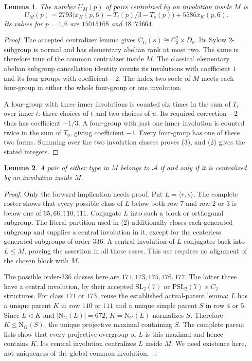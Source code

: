\documentclass[11pt,a4paper]{article}
\newtheorem{lemma}{Lemma}
\newcommand{\C}{\mathrm C}\newcommand{\N}{\mathrm N}\newcommand{\Z}{\mathrm Z}
\begin{document}
\begin{lemma}\label{internal}
The number $U_M(p)$ of pairs centralized by an involution inside $M$ is
\[
 U_M(p)=2793\bigl(x_H(p,6)-T_i(p)/3-T_o(p)\bigr)
                      +5586x_K(p,6).                       \tag{3}
\]
Its values for $p=4,6$ are $15015168$ and $48173664$.
\end{lemma}
\begin{proof}
The accepted centralizer lemma gives
$\C_G(s)\cong C_3^2\times D_8$. Its Sylow 2-subgroup is normal
and has elementary abelian rank at most two. The same is therefore true
of the common centralizer inside $M$. The classical elementary
abelian subgroup cancellation identity counts its involutions
with coefficient $1$ and its four-groups with coefficient $-2$.
The index-two socle of $M$ meets each four-group in either the whole
four-group or one involution.

A four-group with three inner involutions is counted six times
in the sum of $T_i$ over inner $t$: three choices of $t$ and two
choices of $u$. Its required correction $-2$ thus has coefficient
$-1/3$. A four-group with just one inner involution is counted twice
in the sum of $T_o$, giving coefficient $-1$. Every four-group has
one of these two forms. Summing over the two involution classes
proves (3), and (2) gives the stated integers.
\end{proof}

\begin{lemma}\label{external}
A pair of either type in $M$ belongs to $\mathcal A$ if and only
if it is centralized by an involution inside $M$.
\end{lemma}
\begin{proof}
Only the forward implication needs proof. Put $L=\langle r,s\rangle$.
The complete roster shows that every possible class of $L$ below
both row $7$ and row $2$ or $3$ is below one of $65,66,110,111$.
Conjugate $L$ into such a block or orthogonal subgroup. The literal
partition used in (2) additionally closes each generated subgroup
and supplies a central involution in it, except for the centerless
generated subgroups of order $336$. A central involution of $L$
conjugates back into $L\le M$, proving the assertion in all those
cases. This use requires no alignment of the chosen block with $M$.

The possible order-$336$ classes here are $171,173,175,176,177$.
The latter three have a central involution, by their accepted
$\mathrm{SL}_2(7)$ or $\mathrm{PSL}_2(7)\times C_2$ structures.
For class $171$ or $173$, reuse the established actual-parent lemma:
$L$ has a unique parent $K$ in row $110$ or $111$ and a unique
simple parent $S$ in row $4$ or $5$. Since $L\lhd K$ and
$|\N_G(L)|=672$, $K=\N_G(L)$ normalizes $S$. Therefore
$K\le\N_G(S)$, the unique projective maximal containing $S$.
The complete parent lists show that every projective overgroup
of $L$ is this maximal and hence contains $K$. Its central
involution centralizes $L$ inside $M$. We need existence here,
not uniqueness of the global common involution.
\end{proof}
\end{document}
